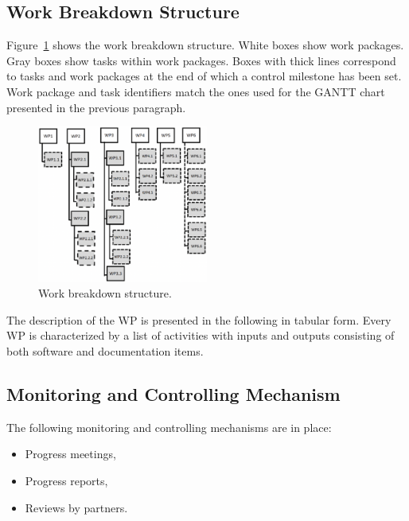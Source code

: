 \clearpage

\subsection{Work Breakdown Structure}

Figure~\ref{fig:work_breakdown} shows the work breakdown structure. White boxes show work packages. Gray boxes show tasks within work packages. Boxes with thick lines correspond to tasks and work packages at the end of which a control milestone has been set. Work package and task identifiers match the ones used for the GANTT chart presented in the previous paragraph.

\begin{figure}[H]
\caption{Work breakdown structure.}
\label{fig:work_breakdown}
\centering
\includegraphics[width=0.5\textwidth]{images/work_breakdown}
\end{figure}

The description of the WP is presented in the following in tabular form.
Every WP is characterized by a list of activities with inputs and outputs consisting of both software and documentation items.



\clearpage

\subsection{Monitoring and Controlling Mechanism}

The following monitoring and controlling mechanisms are in place:
\begin{itemize}
  \item Progress meetings,
  \item Progress reports,
  \item Reviews by partners.
\end{itemize}

